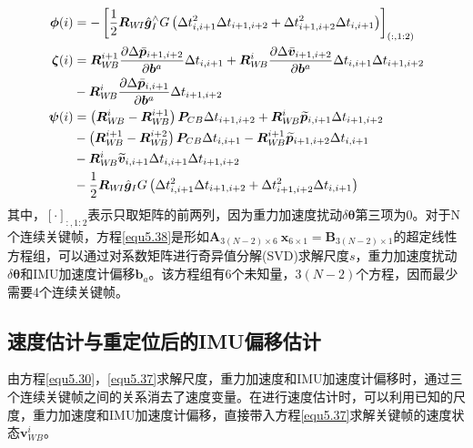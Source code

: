 \begin{equation}
\label{equ5.39}
\begin{aligned}
\boldsymbol{\phi} (i)  &= - \left[ {1 \over 2} \boldsymbol{R}_{W\!I}\hat{\boldsymbol{g}}_I^{\wedge} G \left( \Delta t_{i,i+1}^2 \Delta t_{i+1,i+2}+  \Delta t_{i+1,i+2}^2 \Delta t_{i,i+1} \right) \right]_{(:,1:2)}
\\ 
\boldsymbol{\zeta} (i) &=  \boldsymbol{R}_{W\!B}^{i+1} {\partial \Delta \bar{\boldsymbol{p}}_{i+1,i+2} \over \partial \boldsymbol{b}^a } \Delta t_{i,i+1} + \boldsymbol{R}_{W\!B}^i {\partial \Delta \bar{\boldsymbol{v}}_{i+1,i+2} \over \partial \boldsymbol{b}^a } \Delta t_{i,i+1} \Delta t_{i+1,i+2} \\
 &- \boldsymbol{R}_{W\!B}^{i} {\partial \Delta \bar{\boldsymbol{p}}_{i,i+1} \over \partial \boldsymbol{b}^a } \Delta t_{i+1,i+2} 
\\  
\boldsymbol{\psi} (i) & = \left( \boldsymbol{R}_{W\!B}^{i} - \boldsymbol{R}_{W\!B}^{i+1} \right) \boldsymbol{P}_{CB} \Delta t_{i+1,i+2} + \boldsymbol{R}_{W\!B}^{i} \widetilde{\boldsymbol{p}}_{i,i+1} \Delta t_{i+1,i+2} \\
& - \left( \boldsymbol{R}_{W\!B}^{i+1} - \boldsymbol{R}_{W\!B}^{i+2} \right) \boldsymbol{P}_{CB} \Delta t_{i,i+1} - \boldsymbol{R}_{W\!B}^{i+1} \widetilde{\boldsymbol{p}}_{i+1,i+2} \Delta t_{i,i+1} \\ 
& - \boldsymbol{R}_{W\!B}^{i} \widetilde{\boldsymbol{v}}_{i,i+1}  \Delta t_{i,i+1} \Delta t_{i+1,i+2} \\
& - {1 \over 2} \boldsymbol{R}_{W\!I} \hat{\boldsymbol{g}}_I G \left( \Delta t_{i,i+1}^2 \Delta t_{i+1,i+2} + \Delta t_{i+1,i+2}^2 \Delta t_{i,i+1} \right)
\end{aligned}
\end{equation}
其中，$[\cdot]_{:,1:2}$表示只取矩阵的前两列，因为重力加速度扰动$\delta \boldsymbol{\theta}$第三项为0。对于N个连续关键帧，方程\eqref{equ5.38}是形如$\boldsymbol{A}_{3(N-2)\times 6}\  \boldsymbol{x}_{6\times 1} = \boldsymbol{B}_{3(N-2)\times 1}$的超定线性方程组，可以通过对系数矩阵进行奇异值分解(SVD)求解尺度$s$，重力加速度扰动$\delta \boldsymbol{\theta}$和IMU加速度计偏移$\boldsymbol{b}_a$。该方程组有6个未知量，$3(N-2)$个方程，因而最少需要4个连续关键帧。


\subsection{速度估计与重定位后的IMU偏移估计}
由方程\eqref{equ5.30}，\eqref{equ5.37}求解尺度，重力加速度和IMU加速度计偏移时，通过三个连续关键帧之间的关系消去了速度变量。在进行速度估计时，可以利用已知的尺度，重力加速度和IMU加速度计偏移，直接带入方程\eqref{equ5.37}求解关键帧的速度状态$\boldsymbol{v}_{W\!B}^i$。

